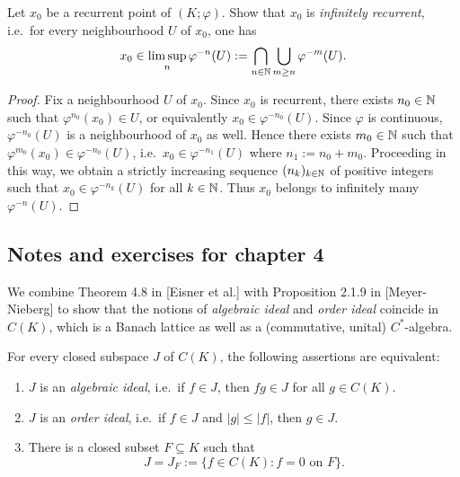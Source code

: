 \begin{exercise}[Exercise 3.6]
	Let $x_0$ be a recurrent point of $(K;\varphi)$. Show that $x_0$ is \emph{infinitely recurrent}, i.e.\ for every neighbourhood $U$ of $x_0$, one has
	\begin{equation*}
		x_0 \in \limsup_n \varphi^{-n}(U) := \bigcap_{n\in\mathbb{N}} \bigcup_{m\ge n} \varphi^{-m}(U).
	\end{equation*}
\end{exercise}

\begin{proof}
	Fix a neighbourhood $U$ of $x_0$. Since $x_0$ is recurrent, there exists $n_0\in\mathbb{N}$ such that $\varphi^{n_0}(x_0) \in U$, or equivalently $x_0 \in \varphi^{-n_0}(U)$. Since $\varphi$ is continuous, $\varphi^{-n_0}(U)$ is a neighbourhood of $x_0$ as well. Hence there exists $m_0 \in \mathbb{N}$ such that $\varphi^{m_0}(x_0) \in \varphi^{-n_0}(U)$, i.e.\ $x_0 \in \varphi^{-n_1}(U)$ where $n_1 := n_0+m_0$. Proceeding in this way, we obtain a strictly increasing sequence $(n_k)_{k\in\mathbb{N}}$ of positive integers such that $x_0 \in \varphi^{-n_k}(U)$ for all $k\in\mathbb{N}$. Thus $x_0$ belongs to infinitely many $\varphi^{-n}(U)$.
\end{proof}

\subsection{Notes and exercises for chapter 4}

We combine Theorem 4.8 in [Eisner et al.] with Proposition 2.1.9 in [Meyer-Nieberg] to show that the notions of \emph{algebraic ideal} and \emph{order ideal} coincide in $C(K)$, which is a Banach lattice as well as a (commutative, unital) $C^*$-algebra.

\begin{theorem}
	For every closed subspace $J$ of $C(K)$, the following assertions are equivalent:
	\begin{enumerate}[\upshape (i)]
		\item $J$ is an \emph{algebraic ideal}, i.e.\ if $f \in J$, then $fg \in J$ for all $g \in C(K)$.
		\item $J$ is an \emph{order ideal}, i.e.\ if $f \in J$ and $|g| \le |f|$, then $g \in J$.
		\item There is a closed subset $F \subseteq K$ such that
		\begin{equation}
			J = J_F := \{ f\in C(K) : f = 0 \text{ on } F\}.
		\end{equation}
	\end{enumerate}
\end{theorem}

